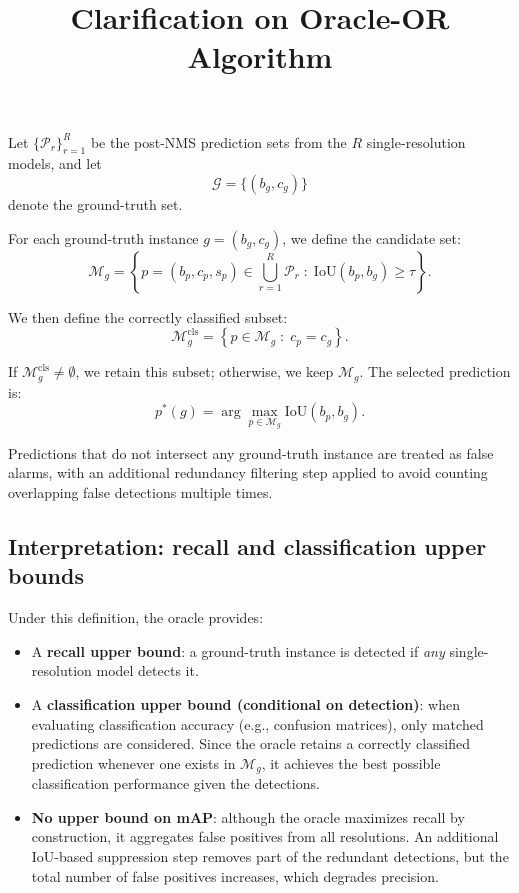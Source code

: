 \documentclass[11pt]{article}
\title{Clarification on Oracle-OR Algorithm}
\author{}
\date{}
\begin{document}
\maketitle

Let $\{\mathcal{P}_r\}_{r=1}^{R}$ be the post-NMS prediction sets from the $R$ single-resolution models, and let
\[
\mathcal{G}=\{(b_g,c_g)\}
\]
denote the ground-truth set.

For each ground-truth instance $g=(b_g,c_g)$, we define the candidate set:
\[
\mathcal{M}_g = \left\{ p=(b_p,c_p,s_p)\in \bigcup_{r=1}^{R}\mathcal{P}_r \;:\; \mathrm{IoU}(b_p,b_g)\geq \tau \right\}.
\]

We then define the correctly classified subset:
\[
\mathcal{M}_g^{\mathrm{cls}} = \left\{ p\in \mathcal{M}_g \;:\; c_p = c_g \right\}.
\]

If $\mathcal{M}_g^{\mathrm{cls}}\neq\emptyset$, we retain this subset; otherwise, we keep $\mathcal{M}_g$. The selected prediction is:
\[
p^*(g) = \arg\max_{p\in\mathcal{M}_g} \mathrm{IoU}(b_p,b_g).
\]

Predictions that do not intersect any ground-truth instance are treated as false alarms, with an additional redundancy filtering step applied to avoid counting overlapping false detections multiple times.

\subsection*{Interpretation: recall and classification upper bounds}

Under this definition, the oracle provides:

\begin{itemize}
    \item A \textbf{recall upper bound}: a ground-truth instance is detected if \emph{any} single-resolution model detects it.

    \item A \textbf{classification upper bound (conditional on detection)}: when evaluating classification accuracy (e.g., confusion matrices), only matched predictions are considered. Since the oracle retains a correctly classified prediction whenever one exists in $\mathcal{M}_g$, it achieves the best possible classification performance given the detections.

    \item \textbf{No upper bound on mAP}: although the oracle maximizes recall by construction, it aggregates false positives from all resolutions. An additional IoU-based suppression step removes part of the redundant detections, but the total number of false positives increases, which degrades precision.
\end{itemize}
\end{document}
